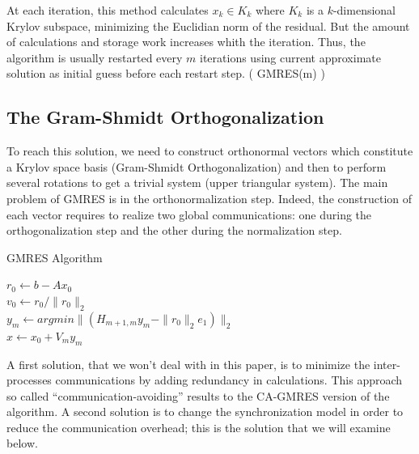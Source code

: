 \documentclass{llncs}
\begin{document}
At each iteration, this method calculates $x_{k} \in K_{k}$ where $K_{k}$ is a $k$-dimensional Krylov subspace, minimizing the Euclidian norm of the residual. But the amount of calculations and storage work increases whith the iteration. Thus, the algorithm is usually restarted every $m$ iterations using current approximate solution as initial guess before each restart step. ( GMRES(m) ) \cite{GMRES}

\subsection{The Gram-Shmidt Orthogonalization}
To reach this solution, we need to construct orthonormal vectors which constitute a Krylov space basis (Gram-Shmidt Orthogonalization) and then to perform several rotations to get a trivial system (upper triangular system). The main problem of GMRES is in the orthonormalization step. Indeed, the construction of each vector requires to realize two global communications: one during the orthogonalization step and the other during the normalization step.

\begin{algorithm}
\caption{GMRES Algorithm}
$r_0 \gets b-Ax_0$\\  
$v_0 \gets r_0/\|r_0\|_2$\\ 
  $y_m \gets argmin\|(H_{m+1,m}y_m - \|r_0\|_2e_1)\|_2$\\
  $x \gets x_0 + V_my_m$
\end{algorithm}

A first solution, that we won't deal with in this paper, is to minimize the inter-processes communications by adding redundancy in calculations. This approach so called \enquote{communication-avoiding} \cite{CAGMRES} results to the CA-GMRES version of the algorithm. A second solution is to change the synchronization model in order to reduce the communication overhead; this is the solution that we will examine below.
\end{document}
